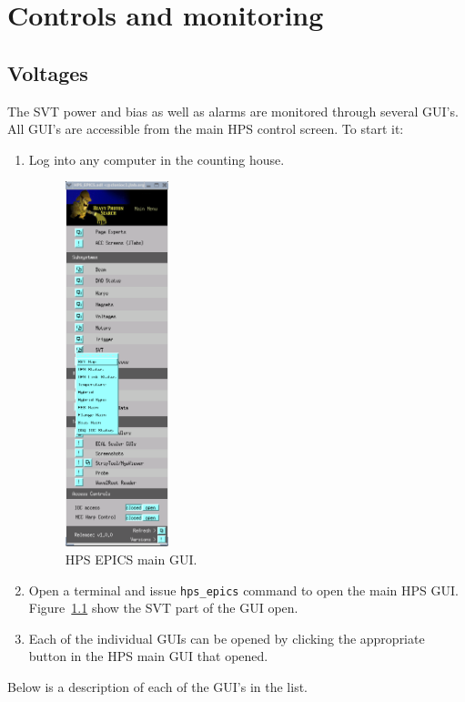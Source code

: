 \documentclass[12pt]{report}
\begin{document}
\chapter{Controls and monitoring}

\section{Voltages}
\label{sec:monitoring_power}
The SVT power and bias as well as alarms are monitored through several GUI's. All GUI's are accessible from the main HPS control screen. To start it:

\begin{enumerate}
\item Log into any computer in the counting house.

\begin{figure}[ht!]
\centering
\includegraphics[width=3cm]{epics_dev_svt.png}
\caption{HPS EPICS main GUI. \label{fig:hps_epics_svt}}
\end{figure}

\item Open a terminal and issue \texttt{hps\_epics} command to open the main HPS GUI. Figure~\ref{fig:hps_epics_svt} show the SVT part of the GUI open.
\item Each of the individual GUIs can be opened by clicking the appropriate button in the HPS main GUI that opened.
\end{enumerate}

Below is a description of each of the GUI's in the list.
\end{document}
